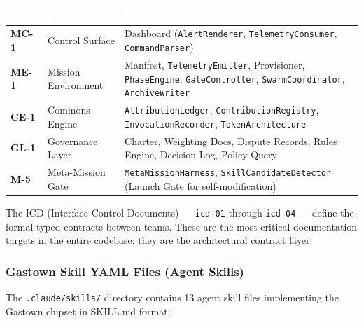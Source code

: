 \documentclass[11pt,letterpaper]{article}
\newcommand{\tableheader}[1]{\textbf{\sffamily\textcolor{white}{#1}}}
\begin{document}
\begin{center}
\begin{tabularx}{\textwidth}{L{2cm}L{3.5cm}X}
\toprule
{}
\tableheader{Team} & \tableheader{Prefix} & \tableheader{Responsibility} \\
\midrule
\textbf{MC-1} & Control Surface & Dashboard (\texttt{AlertRenderer}, \texttt{TelemetryConsumer}, \texttt{CommandParser}) \\
\textbf{ME-1} & Mission Environment & Manifest, \texttt{TelemetryEmitter}, Provisioner, \texttt{PhaseEngine}, \texttt{GateController}, \texttt{SwarmCoordinator}, \texttt{ArchiveWriter} \\
\textbf{CE-1} & Commons Engine & \texttt{AttributionLedger}, \texttt{ContributionRegistry}, \texttt{InvocationRecorder}, \texttt{TokenArchitecture} \\
\textbf{GL-1} & Governance Layer & Charter, Weighting Docs, Dispute Records, Rules Engine, Decision Log, Policy Query \\
\textbf{M-5} & Meta-Mission Gate & \texttt{MetaMissionHarness}, \texttt{SkillCandidateDetector} (Launch Gate for self-modification) \\
\bottomrule
\end{tabularx}
\end{center}

The ICD (Interface Control Documents) --- \texttt{icd-01} through \texttt{icd-04} --- define the formal typed contracts between teams. These are the most critical documentation targets in the entire codebase: they are the architectural contract layer.

\subsubsection{Gastown Skill YAML Files (Agent Skills)}

The \texttt{.claude/skills/} directory contains 13 agent skill files implementing the Gastown chipset in SKILL.md format:
\end{document}
